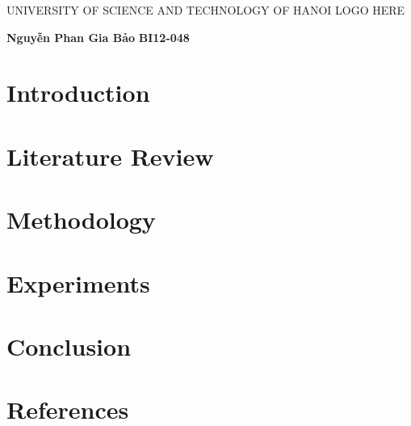 \documentclass[14pt]{extreport}
\begin{document}
\begin{titlepage}
    \begin{center}
        \begin{adjustwidth}{-100pt}{-100pt}
            \centering
            {\fontsize{20}{15}\selectfont UNIVERSITY OF SCIENCE AND TECHNOLOGY OF HANOI}
            \vspace{1cm}
            \newline
            \vspace{2cm}
            {\HUGE LOGO HERE}
            \vspace{2cm}

        \end{adjustwidth}
        \textbf{}
        \newline
        \vspace{4cm}
        \textbf{\Large Nguyễn Phan Gia Bảo}
        \newline
        \textbf{\Large BI12-048}
        \date{}
    \end{center}
\end{titlepage}


\begingroup\singlespacing
\tableofcontents
\endgroup
\clearpage


\chapter{Introduction}

\chapter{Literature Review}

\chapter{Methodology}

\chapter{Experiments}

\chapter{Conclusion}

\chapter{References}
\end{document}
